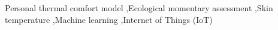 \begin{frontmatter}
    \begin{keyword}
        Personal thermal comfort model \sep Ecological momentary assessment \sep Skin temperature \sep Machine learning \sep Internet of Things (IoT)
    \end{keyword}

\end{frontmatter}
